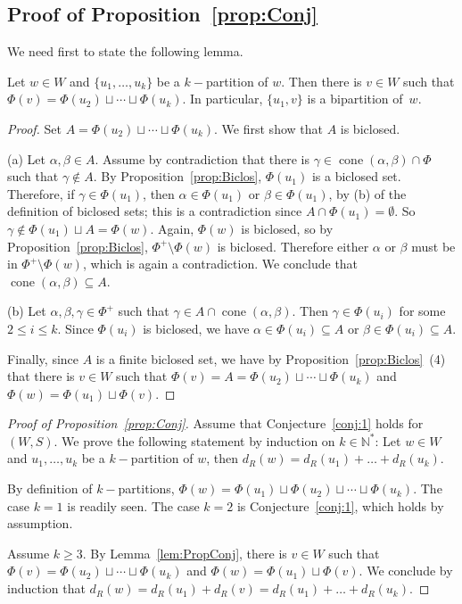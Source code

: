\documentclass[Unicode]{cedram-alco}
\theoremstyle{definition}
\newcommand{\cone}{\operatorname{cone}}
\begin{document}
\subsection{Proof of Proposition~\ref{prop:Conj}}  We need first to state the following lemma.

\begin{lemm}\label{lem:PropConj} Let  $w\in W$ and $\{u_1,\dots,u_k\}$ be a $k-$partition of $w$. Then there is $v\in W$ such that $\Phi(v)=\Phi(u_2) \sqcup \cdots \sqcup \Phi(u_{k})$. In particular, $\{u_1,v\}$ is a bipartition of~$w$.
\end{lemm}
\begin{proof} Set $A=\Phi(u_2) \sqcup \cdots \sqcup \Phi(u_{k})$.  We first show that $A$ is biclosed. 



(a) Let $\alpha,\beta \in A$. Assume by contradiction that there is $\gamma\in \cone(\alpha,\beta)\cap \Phi$ such that $\gamma\notin A$.  By Proposition~\ref{prop:Biclos}, $\Phi(u_1)$ is a biclosed set. Therefore, if $\gamma\in \Phi(u_1)$, then  $\alpha\in\Phi(u_1)$ or $\beta\in \Phi(u_1)$,  by (b) of the definition of biclosed sets; this is a contradiction since $A\cap \Phi(u_1)=\emptyset$. So $\gamma\notin  \Phi(u_1)\sqcup A=\Phi(w)$. Again, $\Phi(w)$ is biclosed, so by Proposition~\ref{prop:Biclos}, $\Phi^+\setminus \Phi(w)$ is biclosed. Therefore either $\alpha$ or $\beta$ must be in $\Phi^+\setminus \Phi(w)$, which is again a contradiction. We conclude that $\cone(\alpha,\beta)\subseteq A$.



(b)  Let $\alpha,\beta,\gamma\in \Phi^+$ such that $\gamma\in A\cap \cone(\alpha,\beta)$. Then $\gamma\in \Phi(u_i)$ for some $2\leq i\leq k$. Since $\Phi(u_i)$ is biclosed, we have $\alpha\in\Phi(u_i)\subseteq A$ or $\beta\in \Phi(u_i)\subseteq A$.



Finally, since $A$ is a finite biclosed set, we have by Proposition~\ref{prop:Biclos}~(4) that there is $v\in W$ such that $\Phi(v)=A=\Phi(u_2) \sqcup \cdots \sqcup \Phi(u_{k})$ and $\Phi(w)=\Phi(u_1)\sqcup \Phi(v)$. 
\end{proof}

\begin{proof}[Proof of Proposition~\ref{prop:Conj}] Assume that Conjecture~\ref{conj:1} holds for $(W,S)$. We prove the following statement by induction on $k\in\mathbb N^*$: Let  $w\in W$ and $u_1,\dots,u_k$ be a $k-$partition of $w$, then $d_R(w)=d_R(u_1)+\dots+d_R(u_k)$.

By definition of $k-$partitions, $\Phi(w)=\Phi(u_1)\sqcup \Phi(u_2) \sqcup \cdots \sqcup \Phi(u_{k})$.
The case $k=1$ is readily seen. The case $k=2$ is  Conjecture~\ref{conj:1}, which holds by assumption.

Assume $k\geq 3$. By Lemma~\ref{lem:PropConj}, there is $v\in W$ such that $\Phi(v)=\Phi(u_2) \sqcup \cdots \sqcup \Phi(u_{k})$ and $\Phi(w)=\Phi(u_1)\sqcup \Phi(v)$. We conclude by induction  that  $d_R(w)=d_R(u_1)+d_R(v)=d_R(u_1)+\dots+d_R(u_k)$. 
\end{proof}
\end{document}
